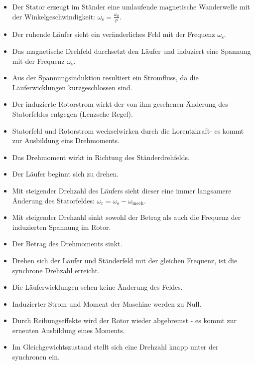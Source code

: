 \begin{frame}	
	\begin{itemize}
		\item Der Stator erzeugt im Ständer eine umlaufende magnetische Wanderwelle mit der Winkelgeschwindigkeit:
		$\omega_\mathrm{s} = \frac{\omega_0}{p}$.\pause
		\item Der ruhende Läufer sieht ein veränderliches Feld mit der Frequenz $\omega_\mathrm{s}$.\pause
		\item Das magnetische Drehfeld durchsetzt den Läufer und induziert eine Spannung mit der Frequenz $\omega_\mathrm{s}$.\pause
		\item Aus der Spannungsinduktion resultiert ein Stromfluss, da die Läuferwicklungen kurzgeschlossen sind.\pause
		\item Der induzierte Rotorstrom wirkt der von ihm gesehenen Änderung des Statorfeldes entgegen (Lenzsche Regel).\pause
		\item Statorfeld und Rotorstrom wechselwirken durch die Lorentzkraft- es kommt zur Ausbildung eins Drehmoments.\pause
		\item Das Drehmoment wirkt in Richtung des Ständerdrehfelds.\pause
		\item Der Läufer beginnt sich zu drehen.
	\end{itemize}
\end{frame}

\begin{frame}	    
	\begin{itemize}
		\item Mit steigender Drehzahl des Läufers sieht dieser eine immer langsamere Änderung des Statorfeldes:
		$\omega_\mathrm{r} = \omega_\mathrm{s} - \omega_\mathrm{mech}$.\pause
		\item Mit steigender Drehzahl sinkt sowohl der Betrag als auch die Frequenz der induzierten Spannung im Rotor.\pause
		\item Der Betrag des Drehmoments sinkt.\pause
		\item Drehen sich der Läufer und Ständerfeld mit der gleichen Frequenz, ist die synchrone Drehzahl erreicht.\pause
		\item Die Läuferwicklungen sehen keine Änderung des Feldes.\pause
		\item Induzierter Strom und Moment der Maschine werden zu Null.\pause
		\item Durch Reibungseffekte wird der Rotor wieder abgebremst - es kommt zur erneuten Ausbildung eines Moments.\pause
		\item Im Gleichgewichtszustand stellt sich eine Drehzahl knapp unter der synchronen ein.
	\end{itemize}
\end{frame}


